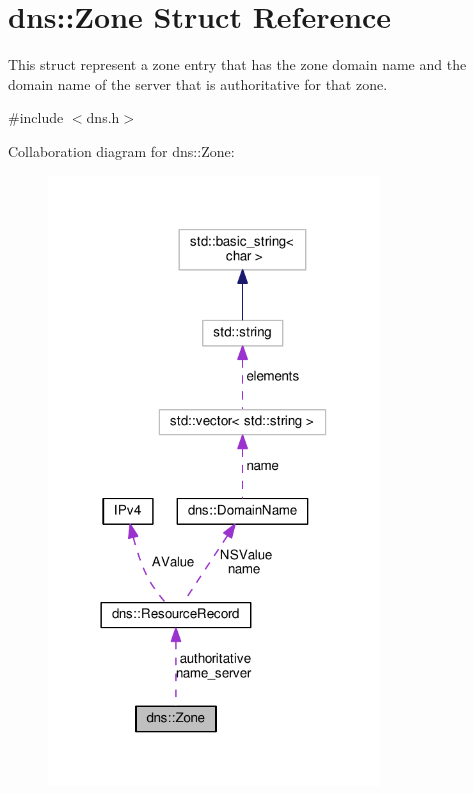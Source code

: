 \hypertarget{structdns_1_1Zone}{}\section{dns\+:\+:Zone Struct Reference}
\label{structdns_1_1Zone}


This struct represent a zone entry that has the zone domain name and the domain name of the server that is authoritative for that zone.  




{\ttfamily \#include $<$dns.\+h$>$}



Collaboration diagram for dns\+:\+:Zone\+:
\nopagebreak
\begin{figure}[H]
\begin{center}
\leavevmode
\includegraphics[width=249pt]{structdns_1_1Zone__coll__graph}
\end{center}
\end{figure}
